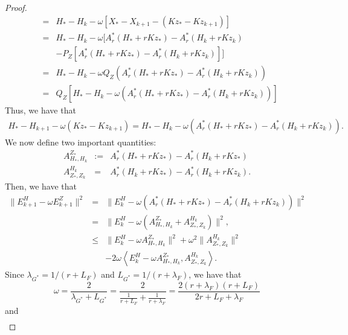 \begin{proof}
\begin{eqnarray*}
&=& H_* - H_k - \omega [ X_* - X_{k+1} - (Kz_* - K z_{k+1}) ] \\  
&=& H_* - H_k - \omega [ A_r^{*} (H_* + r K z_*) - A_r^{*} (H_k + r K z_k) \\
&& - P_Z [ A_r^{*} (H_* + rK z_*) - A_r^{*} (H_k + rK z_k) ] ] \\
&=& H_* - H_k - \omega Q_Z (A_r^{*} (H_* + r K z_*) - A_r^{*} (H_k + r K z_k)) \\ 
&=& Q_Z [H_* - H_k - \omega (A_r^{*} (H_* + r K z_*) - A_r^{*} (H_k + r K z_k))] 
\end{eqnarray*}
Thus, we have that 
\begin{eqnarray*}
H_{*} - H_{k+1} - \omega (Kz_* - K z_{k+1}) = H_* - H_k - \omega (A_r^{*} (H_* + r K z_*) - A_r^{*} (H_k + r K z_k)). 
\end{eqnarray*}
We now define two important quantities: 
\begin{eqnarray}
A_{H_*,H_k}^{Z_*} &:=& A_r^{*} (H_* + rK z_*) - A_r^*(H_k + rKz_*) \\ 
A_{Z_*,Z_k}^{H_k} &=& A_r^*(H_k + rKz_*) - A_r^*(H_k + rKz_k). 
\end{eqnarray}
Then, we have that  
\begin{eqnarray*}
\|E_{k+1}^H - \omega E_{k+1}^Z\|^2 &=& \|E_k^H - \omega (A_r^{*} (H_* + r K z_*) - A_r^{*} (H_k + r K z_k))\|^2 \\ 
&=& \|E_k^H - \omega (A_{H_*,H_k}^{Z_*} + A_{Z_*,Z_k}^{H_k})\|^2,  \\
&\leq& \|E_k^H - \omega A_{H_*,H_k}^{Z_*}\|^2 + \omega^2 \|A_{Z_*,Z_k}^{H_k}\|^2 \\
&& -2 \omega \left \langle E_k^H - \omega A_{H_*,H_k}^{Z_*}, A_{Z_*,Z_k}^{H_k} \right \rangle.  
\end{eqnarray*}
Since $\lambda_{G^*} = 1/(r + L_F)$ and $L_{G^*} = 1/(r + \lambda_F)$, we have that 
\begin{equation}
\omega = \frac{2}{\lambda_{G^*} + L_{G^*}} = \frac{2}{\frac{1}{r + L_F} + \frac{1}{r + \lambda_F}} = \frac{2 (r + \lambda_F)(r + L_F)}{2r + L_F + \lambda_F}  
\end{equation} 
and 
\begin{eqnarray*}

\end{eqnarray*}
\end{proof}
